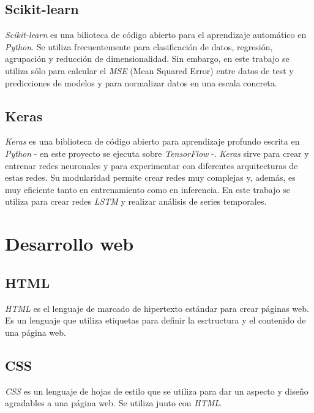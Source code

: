 \subsection{Scikit-learn}\label{scikit-learn}

\emph{Scikit-learn} \citep{online:scikit_learn} es una bilioteca de código abierto para el aprendizaje automático en \emph{Python}. Se utiliza frecuentemente para clasificación de datos, regresión, agrupación y reducción de dimensionalidad. Sin embargo, en este trabajo se utiliza sólo para calcular el \emph{MSE} (Mean Squared Error) entre datos de test y predicciones de modelos y para normalizar datos en una escala concreta.  

\subsection{Keras}\label{keras}

\emph{Keras} \citep{online:keras} es una biblioteca de código abierto para aprendizaje profundo escrita en \emph{Python} - en este proyecto se ejecuta sobre \emph{TensorFlow} \citep{online:tensorflow} -. \emph{Keras} sirve para crear y entrenar redes neuronales y para experimentar con diferentes arquitecturas de estas redes. Su modularidad permite crear redes muy complejas y, además, es muy eficiente tanto en entrenamiento como en inferencia. En este trabajo se utiliza para crear redes \emph{LSTM} y realizar análisis de series temporales. 


\section{Desarrollo web}\label{desarrollo_web}

\subsection{HTML}\label{html}

\emph{HTML} \citep{wiki:html} es el lenguaje de marcado de hipertexto estándar para crear páginas web. Es un lenguaje que utiliza etiquetas para definir la esrtructura y el contenido de una página web. 

\subsection{CSS}\label{css}

\emph{CSS} \citep{wiki:css} es un lenguaje de hojas de estilo que se utiliza para dar un aspecto y diseño agradables a una página web. Se utiliza junto con \emph{HTML}.

